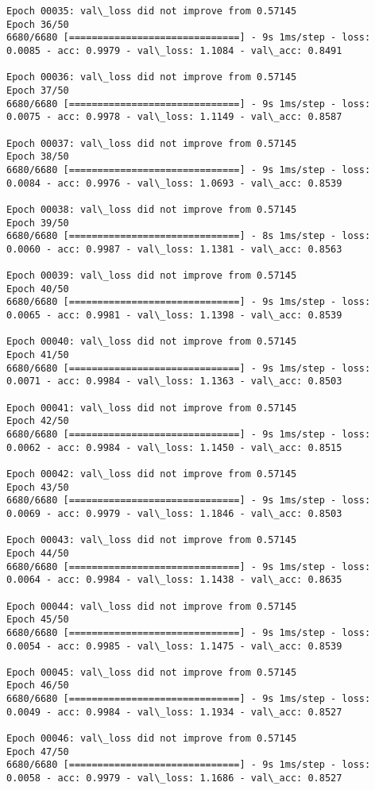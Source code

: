 \documentclass[11pt]{article}
\begin{document}
\begin{Verbatim}[commandchars=\\\{\}]
Epoch 00035: val\_loss did not improve from 0.57145
Epoch 36/50
6680/6680 [==============================] - 9s 1ms/step - loss: 0.0085 - acc: 0.9979 - val\_loss: 1.1084 - val\_acc: 0.8491

Epoch 00036: val\_loss did not improve from 0.57145
Epoch 37/50
6680/6680 [==============================] - 9s 1ms/step - loss: 0.0075 - acc: 0.9978 - val\_loss: 1.1149 - val\_acc: 0.8587

Epoch 00037: val\_loss did not improve from 0.57145
Epoch 38/50
6680/6680 [==============================] - 9s 1ms/step - loss: 0.0084 - acc: 0.9976 - val\_loss: 1.0693 - val\_acc: 0.8539

Epoch 00038: val\_loss did not improve from 0.57145
Epoch 39/50
6680/6680 [==============================] - 8s 1ms/step - loss: 0.0060 - acc: 0.9987 - val\_loss: 1.1381 - val\_acc: 0.8563

Epoch 00039: val\_loss did not improve from 0.57145
Epoch 40/50
6680/6680 [==============================] - 9s 1ms/step - loss: 0.0065 - acc: 0.9981 - val\_loss: 1.1398 - val\_acc: 0.8539

Epoch 00040: val\_loss did not improve from 0.57145
Epoch 41/50
6680/6680 [==============================] - 9s 1ms/step - loss: 0.0071 - acc: 0.9984 - val\_loss: 1.1363 - val\_acc: 0.8503

Epoch 00041: val\_loss did not improve from 0.57145
Epoch 42/50
6680/6680 [==============================] - 9s 1ms/step - loss: 0.0062 - acc: 0.9984 - val\_loss: 1.1450 - val\_acc: 0.8515

Epoch 00042: val\_loss did not improve from 0.57145
Epoch 43/50
6680/6680 [==============================] - 9s 1ms/step - loss: 0.0069 - acc: 0.9979 - val\_loss: 1.1846 - val\_acc: 0.8503

Epoch 00043: val\_loss did not improve from 0.57145
Epoch 44/50
6680/6680 [==============================] - 9s 1ms/step - loss: 0.0064 - acc: 0.9984 - val\_loss: 1.1438 - val\_acc: 0.8635

Epoch 00044: val\_loss did not improve from 0.57145
Epoch 45/50
6680/6680 [==============================] - 9s 1ms/step - loss: 0.0054 - acc: 0.9985 - val\_loss: 1.1475 - val\_acc: 0.8539

Epoch 00045: val\_loss did not improve from 0.57145
Epoch 46/50
6680/6680 [==============================] - 9s 1ms/step - loss: 0.0049 - acc: 0.9984 - val\_loss: 1.1934 - val\_acc: 0.8527

Epoch 00046: val\_loss did not improve from 0.57145
Epoch 47/50
6680/6680 [==============================] - 9s 1ms/step - loss: 0.0058 - acc: 0.9979 - val\_loss: 1.1686 - val\_acc: 0.8527


\end{Verbatim}
\end{document}
